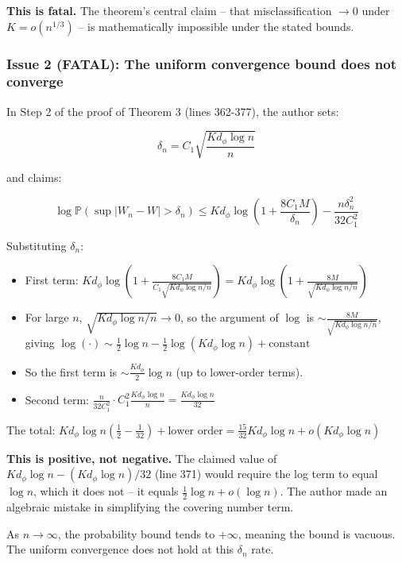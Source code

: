 \documentclass[
  12pt,
]{article}
\providecommand{\tightlist}{%
  \setlength{\itemsep}{0pt}\setlength{\parskip}{0pt}}
\begin{document}
\textbf{This is fatal.} The theorem's central claim -- that
misclassification \(\to 0\) under \(K = o(n^{1/3})\) -- is
mathematically impossible under the stated bounds.

\subsubsection{Issue 2 (FATAL): The uniform convergence bound does not
converge}\label{issue-2-fatal-the-uniform-convergence-bound-does-not-converge}

In Step 2 of the proof of Theorem 3 (lines 362-377), the author sets:

\[\delta_n = C_1 \sqrt{\frac{K d_\phi \log n}{n}}\]

and claims:

\[\log \mathbb{P}(\sup |W_n - W| > \delta_n) \leq K d_\phi \log\left(1 + \frac{8C_1 M}{\delta_n}\right) - \frac{n \delta_n^2}{32 C_1^2}\]

Substituting \(\delta_n\):

\begin{itemize}
\tightlist
\item
  First term:
  \(K d_\phi \log\left(1 + \frac{8C_1 M}{C_1 \sqrt{K d_\phi \log n / n}}\right) = K d_\phi \log\left(1 + \frac{8M}{\sqrt{K d_\phi \log n / n}}\right)\)
\item
  For large \(n\), \(\sqrt{K d_\phi \log n / n} \to 0\), so the argument
  of \(\log\) is \(\sim \frac{8M}{\sqrt{K d_\phi \log n / n}}\), giving
  \(\log(\cdot) \sim \frac{1}{2} \log n - \frac{1}{2} \log(K d_\phi \log n) + \text{constant}\)
\item
  So the first term is \(\sim \frac{K d_\phi}{2} \log n\) (up to
  lower-order terms).
\item
  Second term:
  \(\frac{n}{32 C_1^2} \cdot C_1^2 \frac{K d_\phi \log n}{n} = \frac{K d_\phi \log n}{32}\)
\end{itemize}

The total:
\(K d_\phi \log n \left(\frac{1}{2} - \frac{1}{32}\right) + \text{lower order} = \frac{15}{32} K d_\phi \log n + o(K d_\phi \log n)\)

\textbf{This is positive, not negative.} The claimed value of
\(K d_\phi \log n - (K d_\phi \log n)/32\) (line 371) would require the
log term to equal \(\log n\), which it does not -- it equals
\(\frac{1}{2}\log n + o(\log n)\). The author made an algebraic mistake
in simplifying the covering number term.

As \(n \to \infty\), the probability bound tends to \(+\infty\), meaning
the bound is vacuous. The uniform convergence does not hold at this
\(\delta_n\) rate.
\end{document}
